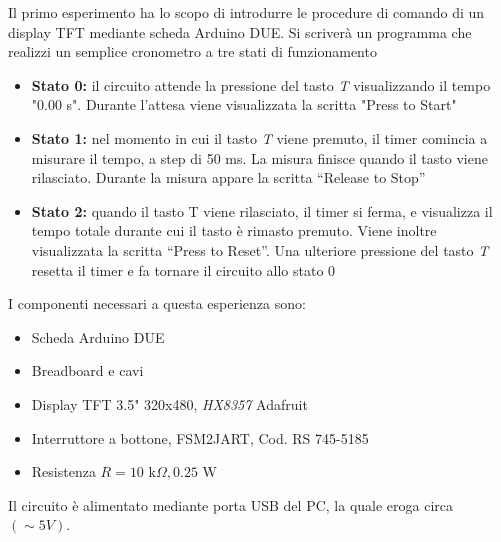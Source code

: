 Il primo esperimento ha lo scopo di introdurre le procedure di comando di un display TFT mediante scheda Arduino DUE. Si scriverà un programma che realizzi un semplice cronometro a tre stati di funzionamento
\begin{itemize}
    \item \textbf{Stato 0:} il circuito attende la pressione del tasto \textit{T} visualizzando il tempo "0.00 s". Durante l'attesa viene visualizzata la scritta "Press to Start"
    \item \textbf{Stato 1:} nel momento in cui il tasto \textit{T} viene premuto, il timer comincia a misurare il tempo, a step di 50 ms. La misura finisce quando il tasto viene rilasciato. Durante la misura appare la scritta “Release to Stop”
    \item \textbf{Stato 2:} quando il tasto T viene rilasciato, il timer si ferma, e visualizza il tempo totale durante cui il tasto è rimasto premuto. Viene inoltre visualizzata la scritta “Press to Reset”. Una ulteriore pressione del tasto \textit{T} resetta il timer e fa tornare il circuito allo stato 0
\end{itemize}
I componenti necessari a questa esperienza sono:
\begin{itemize}
    \item Scheda Arduino DUE
    \item Breadboard e cavi
    \item Display TFT 3.5" 320x480, \textit{HX8357} Adafruit
    \item Interruttore a bottone, FSM2JART, Cod. RS 745-5185
    \item Resistenza $R=10\text{ k}\Omega,0.25\text{ W}$
\end{itemize}
Il circuito è alimentato mediante porta USB del PC, la quale eroga circa $(\sim 5 V)$.
